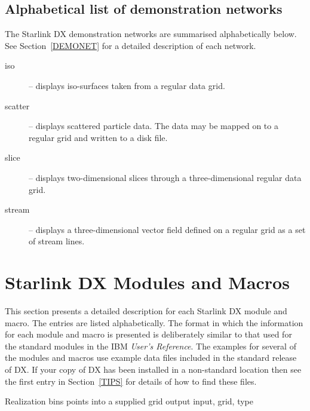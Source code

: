\subsection{Alphabetical list of demonstration networks}

The Starlink DX demonstration networks are summarised alphabetically below.
See Section~\ref{DEMONET} for a detailed description of each network.

\begin{description}

  \item[iso] -- displays iso-surfaces taken from a regular data grid.

  \item[scatter] -- displays scattered particle data. The data may be
   mapped on to a regular grid and written to a disk file.

  \item[slice] -- displays two-dimensional slices through a
   three-dimensional regular data grid.

  \item[stream] -- displays a three-dimensional vector field defined on a
   regular grid as a set of stream lines.

\end{description}


\section{Starlink DX Modules and Macros \label{MODMAC}  }

This section presents a detailed description for each Starlink DX
module and macro. The entries are listed alphabetically. The format
in which the information for each module and macro is presented is
deliberately similar to that used for the standard modules in the IBM
{\it User's Reference}\cite{USERR}. The examples for several of the
modules and macros use example data files included in the standard
release of DX. If your copy of DX has been installed in a non-standard
location then see the first entry in Section~\ref{TIPS} for details of
how to find these files.


%


       {Realization}
       {bins points into a supplied grid}
       {output}
       {input, grid, type}

